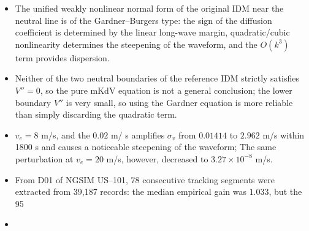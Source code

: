 \documentclass[11pt,a4paper,openany]{book}
\numberwithin{equation}{chapter}
\numberwithin{figure}{chapter}
\numberwithin{table}{chapter}
\begin{document}
\begin{tcolorbox}[keybox]
\begin{itemize}[leftmargin=1.5em,itemsep=4pt]
\item




 The unified weakly nonlinear normal form of the original IDM near the neutral line is of the Gardner–Burgers type: the sign of the diffusion coefficient is determined by the linear long-wave margin, quadratic/cubic nonlinearity determines the steepening of the waveform, and the $O(k^3)$ term provides dispersion.







\item




Neither of the two neutral boundaries of the reference IDM strictly satisfies $V''=0$, so the pure mKdV equation is not a general conclusion; the lower boundary $V''$ is very small, so using the Gardner equation is more reliable than simply discarding the quadratic term.







\item




$v_e=8$ m/s, and the $0.02$ m/ s amplifies $\sigma_v$ from $0.01414$ to $2.962$ m/s within 1800 s and causes a noticeable steepening of the waveform; The same perturbation at $v_e=20$ m/s, however, decreased to $3.27\times10^{-8}$ m/s.







\item




From D01 of NGSIM US--101, 78 consecutive tracking segments were extracted from 39,187 records: the median empirical gain was $1.033$, but the 95%







\item





\end{itemize}
\end{tcolorbox}
\end{document}
